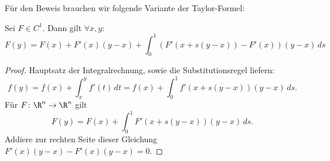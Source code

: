 Für den Beweis brauchen wir folgende Variante der Taylor-Formel:
\begin{lemma}
\label{lem:nichtlineare_gleichungen:taylor_spezial}
Sei $F \in C^1$. Dann gilt $\forall x,y \colon$
\begin{equation*}
 F(y) = F(x)+F'(x)(y-x)+\int_0^1 (F'(x+s(y-x))-F'(x))(y-x) \, ds
\end{equation*}
\end{lemma}
\begin{proof}
Hauptsatz der Integralrechnung, sowie die Substitutionsregel liefern:
\begin{equation*}
 f(y)=f(x)+\int_x^y f'(t) \,dt = f(x)+\int_0^1 f'(x+s(y-x))(y-x) \,ds.
\end{equation*}
Für $F \colon \R^n \to \R^n$ gilt
\begin{equation*}
 F(y)=F(x)+\int_0^1 F'(x+s(y-x))(y-x) \,ds.
\end{equation*}
Addiere zur rechten Seite dieser Gleichung $F' (x)(y-x)-F'(x)(y-x)=0$.
\end{proof}

\bigskip

